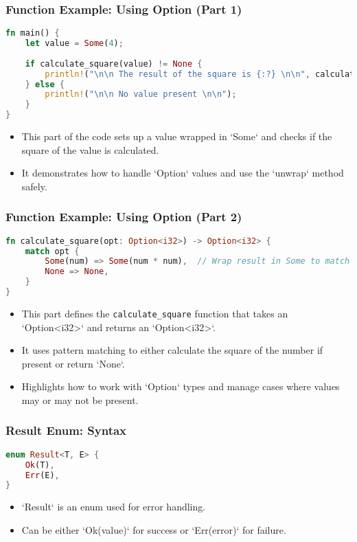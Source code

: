\documentclass[aspectratio=169, table]{beamer}
\begin{document}
\begin{frame}[fragile]
\frametitle{Function Example: Using Option (Part 1)}
\vspace{15pt}
\begin{lstlisting}[language=Rust]
fn main() {
	let value = Some(4);
	
	if calculate_square(value) != None {
		println!("\n\n The result of the square is {:?} \n\n", calculate_square(Some(4)).unwrap());
	} else {
		println!("\n\n No value present \n\n");
	}
}
\end{lstlisting}
\begin{itemize}
\item This part of the code sets up a value wrapped in `Some` and checks if the square of the value is calculated.
\item It demonstrates how to handle `Option` values and use the `unwrap` method safely.
\end{itemize}
\end{frame}

\begin{frame}[fragile]
\frametitle{Function Example: Using Option (Part 2)}
\vspace{20pt}
\begin{lstlisting}[language=Rust]
fn calculate_square(opt: Option<i32>) -> Option<i32> {
	match opt {
		Some(num) => Some(num * num),  // Wrap result in Some to match return type
		None => None,
	}
}
\end{lstlisting}
\begin{itemize}
\item This part defines the \texttt{calculate\_square} function that takes an `Option<i32>` and returns an `Option<i32>`.
\item It uses pattern matching to either calculate the square of the number if present or return `None`.
\item Highlights how to work with `Option` types and manage cases where values may or may not be present.
\end{itemize}
\end{frame}


\begin{frame}[fragile]
\frametitle{Result Enum: Syntax}
\begin{lstlisting}[language=Rust]
enum Result<T, E> {
	Ok(T),
	Err(E),
}
\end{lstlisting}
\begin{itemize}
\item `Result` is an enum used for error handling.
\item Can be either `Ok(value)` for success or `Err(error)` for failure.
\end{itemize}
\end{frame}
\end{document}
